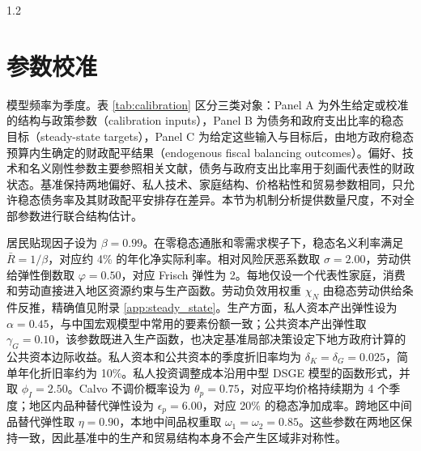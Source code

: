 \documentclass[12pt,UTF8]{ctexart}
\begin{document}
\begin{spacing}{1.2}
		\section{参数校准}
		
		模型频率为季度。表 \ref{tab:calibration} 区分三类对象：Panel A 为外生给定或校准的结构与政策参数（calibration inputs），Panel B 为债务和政府支出比率的稳态目标（steady-state targets），Panel C 为给定这些输入与目标后，由地方政府稳态预算内生确定的财政配平结果（endogenous fiscal balancing outcomes）。偏好、技术和名义刚性参数主要参照相关文献，债务与政府支出比率用于刻画代表性的财政状态。基准保持两地偏好、私人技术、家庭结构、价格粘性和贸易参数相同，只允许稳态债务率及其财政配平安排存在差异。本节为机制分析提供数量尺度，不对全部参数进行联合结构估计。
		
		居民贴现因子设为 $\beta=0.99$。在零稳态通胀和零需求楔子下，稳态名义利率满足 $\bar R=1/\beta$，对应约 4\% 的年化净实际利率。相对风险厌恶系数取 $\sigma=2.00$，劳动供给弹性倒数取 $\varphi=0.50$，对应 Frisch 弹性为 2。每地仅设一个代表性家庭，消费和劳动直接进入地区资源约束与生产函数。劳动负效用权重 $\chi_N$ 由稳态劳动供给条件反推，精确值见附录 \ref{app:steady_state}。生产方面，私人资本产出弹性设为 $\alpha=0.45$，与中国宏观模型中常用的要素份额一致\cite{zhu2018}；公共资本产出弹性取 $\gamma_G=0.10$，该参数既进入生产函数，也决定基准局部决策设定下地方政府计算的公共资本边际收益。私人资本和公共资本的季度折旧率均为 $\delta_K=\delta_G=0.025$，简单年化折旧率约为 10\%。私人投资调整成本沿用中型 DSGE 模型的函数形式\cite{christiano2005,smetswouters2007}，并取 $\phi_I=2.50$。Calvo 不调价概率设为 $\theta_p=0.75$，对应平均价格持续期为 4 个季度；地区内品种替代弹性设为 $\epsilon_p=6.00$，对应 20\% 的稳态净加成率。跨地区中间品替代弹性取 $\eta=0.90$，本地中间品权重取 $\omega_1=\omega_2=0.85$。这些参数在两地区保持一致，因此基准中的生产和贸易结构本身不会产生区域非对称性。
		

\end{spacing}
\end{document}
